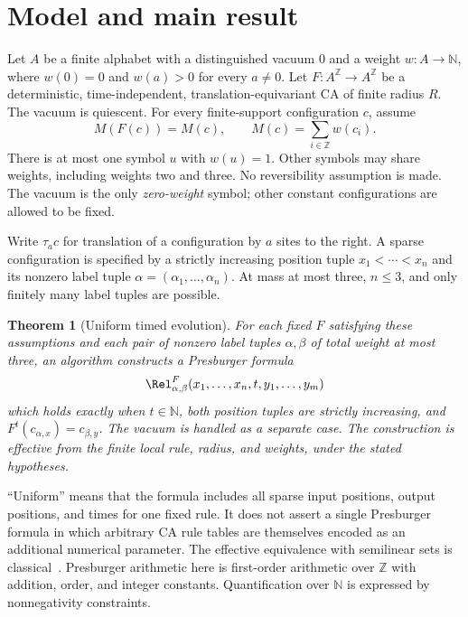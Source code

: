 \documentclass[11pt,letterpaper]{article}
\numberwithin{equation}{section}
\newtheorem{theorem}{Theorem}[section]
\theoremstyle{definition}
\theoremstyle{remark}
\newcommand{\Z}{\mathbb Z}
\newcommand{\NN}{\mathbb N}
\begin{document}
\section{Model and main result}\label{smc:su:sec:model}

Let $A$ be a finite alphabet with a distinguished vacuum $0$ and a weight
$w:A\to\NN$, where $w(0)=0$ and $w(a)>0$ for every $a\ne0$.
Let $F:A^{\Z}\to A^{\Z}$ be a deterministic, time-independent,
translation-equivariant CA of finite radius $R$. The vacuum is quiescent.
For every finite-support configuration $c$, assume
\[
 M(F(c))=M(c),\qquad M(c)=\sum_{i\in\Z}w(c_i).
\]
There is at most one symbol $u$ with $w(u)=1$. Other symbols may share
weights, including weights two and three. No reversibility assumption is made.
The vacuum is the only \emph{zero-weight} symbol; other constant configurations
are allowed to be fixed.

Write $\tau_a c$ for translation of a configuration by $a$ sites to the right.
A sparse configuration is specified by a strictly increasing position tuple
$x_1<\cdots<x_n$ and its nonzero label tuple $\alpha=(\alpha_1,\ldots,\alpha_n)$.
At mass at most three, $n\le3$, and only finitely many label tuples are possible.

\begin{theorem}[Uniform timed evolution]\label{smc:su:thm:main}
For each fixed $F$ satisfying these assumptions and each pair of nonzero label
tuples $\alpha,\beta$ of total weight at most three, an algorithm constructs a
Presburger formula
\[
 \Rel^F_{\alpha,\beta}(x_1,\ldots,x_n,t,y_1,\ldots,y_m)
\]
which holds exactly when $t\in\NN$, both position tuples are strictly increasing,
and $F^t(c_{\alpha,x})=c_{\beta,y}$. The vacuum is handled as a separate case.
The construction is effective from the finite local rule, radius, and weights,
under the stated hypotheses.
\end{theorem}

``Uniform'' means that the formula includes all sparse input positions,
output positions, and times for one fixed rule. It does not assert a single
Presburger formula in which arbitrary CA rule tables are themselves encoded
as an additional numerical parameter. The effective equivalence with semilinear sets is classical~\cite{ginsburgspanier}.
Presburger arithmetic here is first-order
arithmetic over $\Z$ with addition, order, and integer constants. Quantification
over $\NN$ is expressed by nonnegativity constraints.
\end{document}
